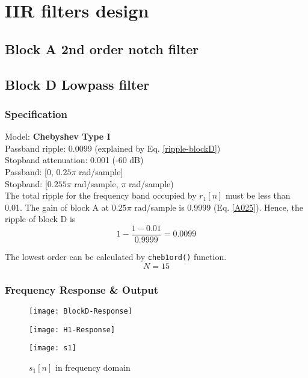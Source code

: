 \documentclass{article}
\newenvironment{homeworkProblem}[1]{
	\section{#1}
	}{
}
\newenvironment{homeworkSection}[1]{
	\subsection{#1}
	}{
}
\begin{document}
\begin{homeworkProblem}{IIR filters design}
\begin{homeworkSection}{Block A 2nd order notch filter}
\end{homeworkSection}


\begin{homeworkSection}{Block D Lowpass filter}


\subsubsection{Specification}
Model: \textbf{Chebyshev Type I}\\
Passband ripple: 0.0099 (explained by Eq. \ref{ripple-blockD})\\
Stopband attenuation: 0.001 (-60 dB)\\
Passband: [0, $0.25\pi$ rad/sample]\\
Stopband: [$0.255\pi$ rad/sample, $\pi$ rad/sample)\\

The total ripple for the frequency band occupied by $r_1[n]$ must be less than 0.01. The gain of block A at $0.25\pi$ rad/sample is 0.9999 (Eq. \ref{A025}). Hence, the ripple of block D is
\begin{equation}\label{ripple-blockD}
1 - \frac{1 - 0.01}{0.9999} = 0.0099
\end{equation}

The lowest order can be calculated by \texttt{cheb1ord()} function.
\begin{equation}
N = 15
\end{equation}


\subsubsection{Frequency Response \& Output}
\begin{figure}[H]
\begin{minipage}[t]{0.33\linewidth}
\centering
\texttt{[image: BlockD-Response]}
\caption{Block D response}
\label{BlockD-Response}
\end{minipage}
\begin{minipage}[t]{0.33\linewidth}
\centering
\texttt{[image: H1-Response]}
\caption{$H_1(z)$ Response}
\label{H1-Response}
\end{minipage}
\begin{minipage}[t]{0.33\linewidth}
\centering
\texttt{[image: s1]}
\caption{$s_1[n]$ in frequency domain}
\label{s1}
\end{minipage}
\end{figure}


\end{homeworkSection}
\end{homeworkProblem}
\end{document}
